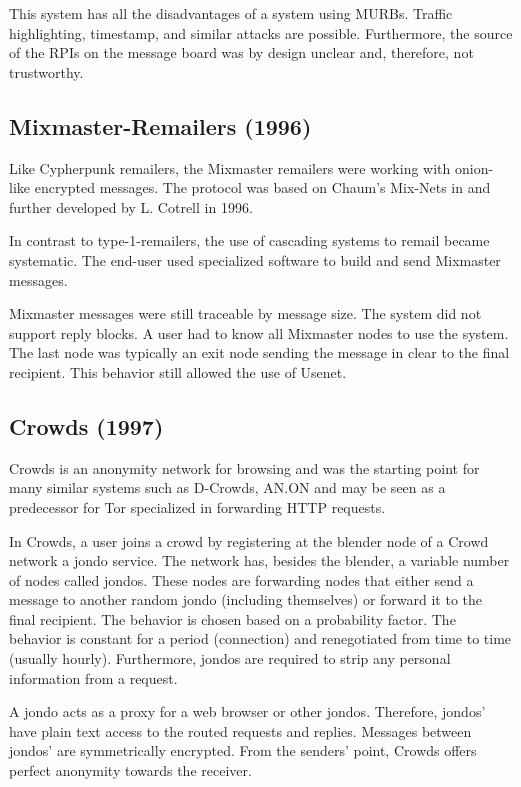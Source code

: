 This system has all the disadvantages of a system using MURBs. Traffic highlighting, timestamp, and similar attacks are possible. Furthermore, the source of the RPIs on the message board was by design unclear and, therefore, not trustworthy.

\subsection{Mixmaster-Remailers (1996)\label{sec:remMixmaster}}
Like Cypherpunk remailers, the Mixmaster remailers were working with onion-like encrypted messages. The protocol was based on Chaum's Mix-Nets in \cite{CHAUM1} and further developed by L. Cotrell in 1996. 

In contrast to type-1-remailers, the use of cascading systems to remail became systematic. The end-user used specialized software to build and send Mixmaster messages.

Mixmaster messages were still traceable by message size. The system did not support reply blocks. A user had to know all Mixmaster nodes to use the system. The last node was typically an exit node sending the message in clear to the final recipient. This behavior still allowed the use of Usenet.

\subsection{Crowds (1997)}
Crowds is an anonymity network for browsing and was the starting point for many similar systems such as D-Crowds, AN.ON and may be seen as a predecessor for Tor specialized in forwarding HTTP requests. 

In Crowds, a user joins a crowd by registering at the blender node of a Crowd network a jondo service. The network has, besides the blender, a variable number of nodes called jondos. These nodes are forwarding nodes that either send a message to another random jondo (including themselves) or forward it to the final recipient. The behavior is chosen based on a probability factor. The behavior is constant for a period (connection) and renegotiated from time to time (usually hourly). Furthermore, jondos are required to strip any personal information from a request. 

A jondo acts as a proxy for a web browser or other jondos. Therefore, jondos' have plain text access to the routed requests and replies. Messages between jondos' are symmetrically encrypted. From the senders' point, Crowds offers perfect anonymity towards the receiver. 


